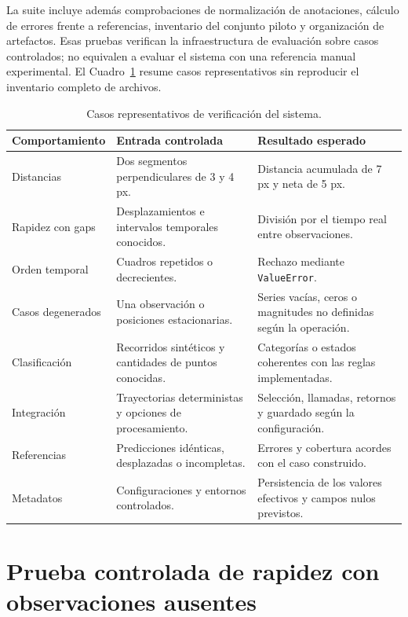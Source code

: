 La suite incluye además comprobaciones de normalización de anotaciones, cálculo de errores frente a referencias, inventario del conjunto piloto y organización de artefactos. Esas pruebas verifican la infraestructura de evaluación sobre casos controlados; no equivalen a evaluar el sistema con una referencia manual experimental. El Cuadro~\ref{tab:matriz-pruebas} resume casos representativos sin reproducir el inventario completo de archivos.

\begin{table}[htbp]
 \centering
 \caption{Casos representativos de verificación del sistema.}
 \label{tab:matriz-pruebas}
 \footnotesize
 \renewcommand{\arraystretch}{1.12}
 \begin{tabularx}{\textwidth}{@{}p{}X X@{}}
  \toprule
  Comportamiento & Entrada controlada & Resultado esperado \\
  \midrule
  Distancias & Dos segmentos perpendiculares de 3 y 4 px. & Distancia acumulada de 7 px y neta de 5 px. \\
  Rapidez con gaps & Desplazamientos e intervalos temporales conocidos. & División por el tiempo real entre observaciones. \\
  Orden temporal & Cuadros repetidos o decrecientes. & Rechazo mediante \texttt{ValueError}. \\
  Casos degenerados & Una observación o posiciones estacionarias. & Series vacías, ceros o magnitudes no definidas según la operación. \\
  Clasificación & Recorridos sintéticos y cantidades de puntos conocidas. & Categorías o estados coherentes con las reglas implementadas. \\
  Integración & Trayectorias deterministas y opciones de procesamiento. & Selección, llamadas, retornos y guardado según la configuración. \\
  Referencias & Predicciones idénticas, desplazadas o incompletas. & Errores y cobertura acordes con el caso construido. \\
  Metadatos & Configuraciones y entornos controlados. & Persistencia de los valores efectivos y campos nulos previstos. \\
  \bottomrule
 \end{tabularx}
\end{table}

\section{Prueba controlada de rapidez con observaciones ausentes}


